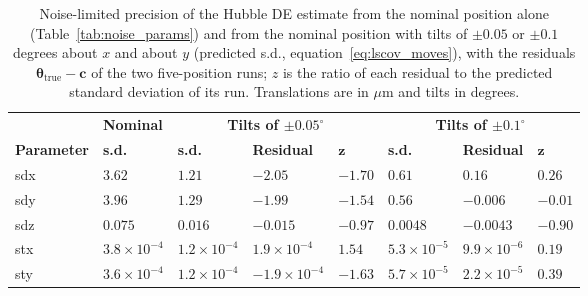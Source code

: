\begin{table}
\centering
\small
\setlength{\tabcolsep}{4pt}
\caption[Noise-limited precision with known moves of the Hubble secondary.]{Noise-limited precision of the Hubble DE estimate from the nominal position alone (Table~\ref{tab:noise_params}) and from the nominal position with tilts of $\pm0.05$ or $\pm0.1$ degrees about $x$ and about $y$ (predicted s.d., equation~\ref{eq:lscov_moves}), with the residuals $\boldsymbol{\theta}_{\mathrm{true}}-\mathbf{c}$ of the two five-position runs; $z$ is the ratio of each residual to the predicted standard deviation of its run. Translations are in $\mu$m and tilts in degrees.}
\label{tab:noise_moves}
\begin{tabular}{llllllll}
\hline
 & \textbf{Nominal} & \multicolumn{3}{c}{\textbf{Tilts of $\boldsymbol{\pm0.05^{\circ}}$}} & \multicolumn{3}{c}{\textbf{Tilts of $\boldsymbol{\pm0.1^{\circ}}$}} \\
\textbf{Parameter} & \textbf{s.d.} & \textbf{s.d.} & \textbf{Residual} & $\boldsymbol{z}$ & \textbf{s.d.} & \textbf{Residual} & $\boldsymbol{z}$ \\
\hline
sdx & $3.62$ & $1.21$ & $-2.05$ & $-1.70$ & $0.61$ & $0.16$ & $0.26$ \\
sdy & $3.96$ & $1.29$ & $-1.99$ & $-1.54$ & $0.56$ & $-0.006$ & $-0.01$ \\
sdz & $0.075$ & $0.016$ & $-0.015$ & $-0.97$ & $0.0048$ & $-0.0043$ & $-0.90$ \\
stx & $3.8\times10^{-4}$ & $1.2\times10^{-4}$ & $1.9\times10^{-4}$ & $1.54$ & $5.3\times10^{-5}$ & $9.9\times10^{-6}$ & $0.19$ \\
sty & $3.6\times10^{-4}$ & $1.2\times10^{-4}$ & $-1.9\times10^{-4}$ & $-1.63$ & $5.7\times10^{-5}$ & $2.2\times10^{-5}$ & $0.39$ \\
\hline
\end{tabular}
\end{table}

